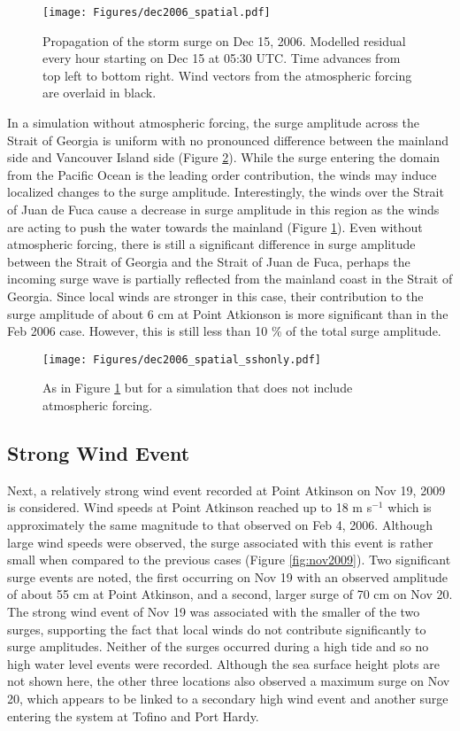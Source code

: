 \documentclass[letterpaper]{tATO2e}
\begin{document}
\begin{figure}
\centering
\texttt{[image: Figures/dec2006\_spatial.pdf]}
\caption{Propagation of the storm surge on Dec 15, 2006. Modelled residual every hour starting on Dec 15 at 05:30 UTC. Time advances from top left to bottom right. Wind vectors from the atmospheric forcing are overlaid in black.}
\label{fig:spatial}
\end{figure}

In a simulation without atmospheric forcing, the surge amplitude across the Strait of Georgia is uniform with no pronounced difference between the mainland side and Vancouver Island side (Figure \ref{fig:spatial_sshonly}). While the surge entering the domain from the Pacific Ocean is the leading order contribution, the winds may induce localized changes to the surge amplitude. Interestingly, the winds over the Strait of Juan de Fuca cause a decrease in surge amplitude in this region as the winds are acting to push the water towards the mainland {\color{red}(Figure \ref{fig:spatial})}.  {\color{red} Even without atmospheric forcing, there is still a significant difference in surge amplitude between the Strait of Georgia and the Strait of Juan de Fuca, perhaps the incoming surge wave is partially reflected from the mainland coast in the Strait of Georgia. Since local winds are stronger in this case, their contribution to the surge amplitude of about 6 cm at Point Atkionson is more significant than in the Feb 2006 case. However, this is still less than 10 \% of the total surge amplitude. } 

\begin{figure}
\centering
\texttt{[image: Figures/dec2006\_spatial\_sshonly.pdf]}
\caption{As in Figure \ref{fig:spatial} but for a simulation that does not include atmospheric forcing. }
\label{fig:spatial_sshonly}
\end{figure}

\subsection{Strong Wind Event}\label{sec:wind}
Next, a relatively strong wind event recorded at Point Atkinson on Nov 19, 2009 is considered. {\color{red} Wind speeds at Point Atkinson reached up to 18 m s$^{-1}$ which is approximately the same magnitude to that observed on Feb 4, 2006.}  Although large wind speeds were observed, the surge associated with this event is rather small when compared to the previous cases (Figure \ref{fig:nov2009}). Two significant surge events are noted, the first occurring on Nov 19 with an observed amplitude of about {\color{red}55 cm} at Point Atkinson, and a second, larger surge of {\color{red} 70 cm} on Nov 20. {\color{red} The strong wind event of Nov 19 was associated with the smaller of the two surges, supporting the fact that local winds do not contribute significantly to surge amplitudes.}  Neither of the surges occurred during a high tide and so no high water level events were recorded. Although {\color{red} the sea surface height plots are} not shown here, the other three locations also observed a maximum surge on Nov 20, which appears to be linked to a secondary high wind event and another surge entering the system at Tofino and Port Hardy. 
\end{document}
